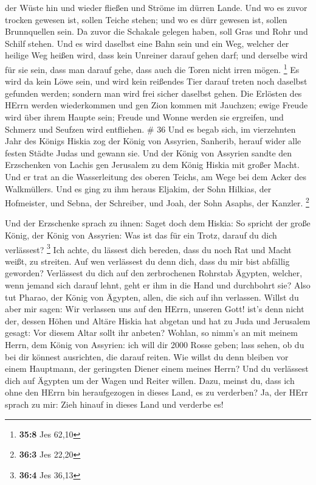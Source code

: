 der Wüste hin und wieder fließen und Ströme im dürren Lande.
 Und wo es zuvor trocken gewesen ist, sollen Teiche stehen;
und wo es dürr gewesen ist, sollen Brunnquellen sein. Da zuvor die
Schakale gelegen haben, soll Gras und Rohr und Schilf stehen.
 Und es wird daselbst eine Bahn sein und ein Weg, welcher
der heilige Weg heißen wird, dass kein Unreiner darauf gehen darf; und
derselbe wird für sie sein, dass man darauf gehe, dass auch die Toren
nicht irren mögen. \footnote{\textbf{35:8} Jes 62,10}  Es
wird da kein Löwe sein, und wird kein reißendes Tier darauf treten noch
daselbst gefunden werden; sondern man wird frei sicher daselbst gehen.
 Die Erlösten des HErrn werden wiederkommen und gen Zion
kommen mit Jauchzen; ewige Freude wird über ihrem Haupte sein; Freude
und Wonne werden sie ergreifen, und Schmerz und Seufzen wird entfliehen.
\# 36  Und es begab sich, im vierzehnten Jahr des Königs
Hiskia zog der König von Assyrien, Sanherib, herauf wider alle festen
Städte Judas und gewann sie.  Und der König von Assyrien
sandte den Erzschenken von Lachis gen Jerusalem zu dem König Hiskia mit
großer Macht. Und er trat an die Wasserleitung des oberen Teichs, am
Wege bei dem Acker des Walkmüllers.  Und es ging zu ihm
heraus Eljakim, der Sohn Hilkias, der Hofmeister, und Sebna, der
Schreiber, und Joah, der Sohn Asaphs, der Kanzler. \footnote{\textbf{36:3}
  Jes 22,20}

 Und der Erzschenke sprach zu ihnen: Saget doch dem Hiskia:
So spricht der große König, der König von Assyrien: Was ist das für ein
Trotz, darauf du dich verlässest? \footnote{\textbf{36:4} Jes 36,13}
 Ich achte, du lässest dich bereden, dass du noch Rat und
Macht weißt, zu streiten. Auf wen verlässest du denn dich, dass du mir
bist abfällig geworden?  Verlässest du dich auf den
zerbrochenen Rohrstab Ägypten, welcher, wenn jemand sich darauf lehnt,
geht er ihm in die Hand und durchbohrt sie? Also tut Pharao, der König
von Ägypten, allen, die sich auf ihn verlassen.  Willst du
aber mir sagen: Wir verlassen uns auf den HErrn, unseren Gott! ist's
denn nicht der, dessen Höhen und Altäre Hiskia hat abgetan und hat zu
Juda und Jerusalem gesagt: Vor diesem Altar sollt ihr anbeten?
 Wohlan, so nimm's an mit meinem Herrn, dem König von
Assyrien: ich will dir 2000 Rosse geben; lass sehen, ob du bei dir
könnest ausrichten, die darauf reiten.  Wie willst du denn
bleiben vor einem Hauptmann, der geringsten Diener einem meines Herrn?
Und du verlässest dich auf Ägypten um der Wagen und Reiter willen.
 Dazu, meinst du, dass ich ohne den HErrn bin heraufgezogen
in dieses Land, es zu verderben? Ja, der HErr sprach zu mir: Zieh hinauf
in dieses Land und verderbe es!

